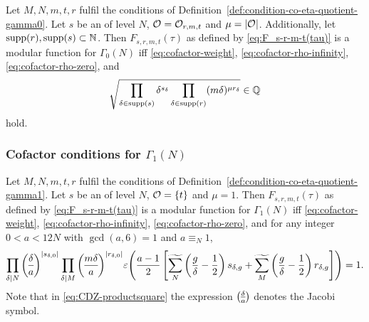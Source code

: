 \documentclass{article}
\begin{document}
\begin{Theorem}\cite[Thm.~45]{Radu_RamanujanKolberg_2015}
  \label{thm:RaduConditions}
  Let $M, N, m, t, r$ fulfil the conditions of
  Definition~\ref{def:condition-co-eta-quotient-gamma0}.
  Let $s$ be an  of level $N$,
  $\mathcal{O}_{}=\mathcal{O}_{r,m,t}$ and
  $\mu=\lvert\mathcal{O}_{}\rvert$.
  Additionally, let $\operatorname{supp}(r), \operatorname{supp}(s) \subset \mathbb{N}$.
  Then $F_{s,r,m,t}(\tau)$ as defined by \eqref{eq:F_s-r-m-t(tau)} is
  a modular function for $\Gamma_0(N)$ iff \eqref{eq:cofactor-weight},
  \eqref{eq:cofactor-rho-infinity}, \eqref{eq:cofactor-rho-zero}, and
  \begin{gather}
    \sqrt{
    \prod_{\delta\in\operatorname{supp}(s)}\delta^{s_\delta}
    \prod_{\delta\in\operatorname{supp}(r)} (m \delta)^{\mu r_\delta}
    }
    \in \mathbb{Q}\label{eq:Radu-productsquare}
  \end{gather}
  hold.
\end{Theorem}


\subsubsection{Cofactor conditions for $\Gamma_1(N)$}


\begin{Theorem}
  \cite[Thm~10.1]{ChenDuZhao_FindingModularFunctionsRamanujan_2019}
  \label{thm:condition-co-eta-quotient-gamma1}
  Let $M, N, m, t, r$ fulfil the conditions of
  Definition~\ref{def:condition-co-eta-quotient-gamma1}.
  Let $s$ be an  of level $N$,
  $\mathcal{O}_{}=\left\{t\right\}$ and $\mu=1$.
  Then $F_{s,r,m,t}(\tau)$ as defined by \eqref{eq:F_s-r-m-t(tau)} is
  a modular function for $\Gamma_1(N)$ iff \eqref{eq:cofactor-weight},
  \eqref{eq:cofactor-rho-infinity}, \eqref{eq:cofactor-rho-zero}, and
  for any integer $0<a<12N$ with $\gcd(a,6)=1$ and $a \equiv_N 1$,
  \begin{gather}
    \divisorprod{N} \jacobisymbol{\delta}{a}^{\abs{s_{\delta,0}}}
    \divisorprod{M} \jacobisymbol{m \delta}{a}^{\abs{r_{\delta,0}}}
    \unityPower{\frac{a-1}{2}
      \left[
      \gensum[N] \left( \frac{g}{\delta} - \frac{1}{2}\right) s_{\delta,g}
      +
      \gensum[M] \left( \frac{g}{\delta} - \frac{1}{2}\right) r_{\delta,g}
      \right]
    }
    =
    1.
    \label{eq:CDZ-productsquare}
  \end{gather}
  Note that in \eqref{eq:CDZ-productsquare} the expression
  $\jacobisymbol{\delta}{a}$ denotes the Jacobi symbol.
\end{Theorem}
\end{document}
